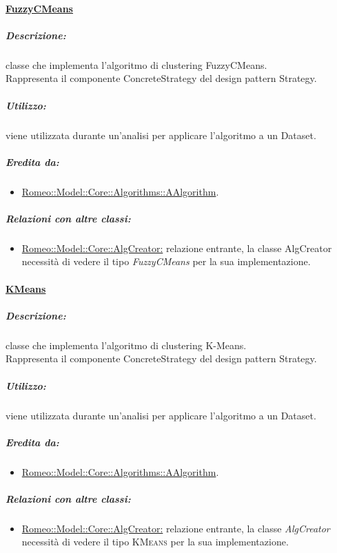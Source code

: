 		\paragraph{\underline{FuzzyCMeans}}
			\label{algorithms:fuzzycmeans}
			
				\subparagraph{Descrizione:} classe che implementa l’algoritmo di clustering\g{} FuzzyCMeans.
				\\Rappresenta il componente ConcreteStrategy del design pattern\g{} Strategy.
				
				\subparagraph{Utilizzo:} viene utilizzata durante un’analisi per applicare l’algoritmo a un Dataset\g{}.
				
				\subparagraph{Eredita da:}
					\begin{itemize}
						\item \hyperref[algorithms::algorithms]{Romeo::Model::Core::Algorithms::AAlgorithm}.
					\end{itemize}
					
				\subparagraph{Relazioni con altre classi:}
					\begin{itemize}
						\item \hyperref[]{Romeo::Model::Core::AlgCreator:} relazione entrante, la classe AlgCreator necessità di vedere il tipo \textsl{FuzzyCMeans} per la sua implementazione.
					\end{itemize}
		
		\paragraph{\underline{KMeans}}
		\label{algorithms::kmeans}
		
			\subparagraph{Descrizione:} classe che implementa l’algoritmo di clustering\g{} K-Means.
			\\Rappresenta il componente ConcreteStrategy del design pattern\g{} Strategy.
			
			\subparagraph{Utilizzo:} viene utilizzata durante un’analisi per applicare l’algoritmo a un Dataset\g{}.
			
			\subparagraph{Eredita da:}
				\begin{itemize}
					\item \hyperref[algorithms::algorithms]{Romeo::Model::Core::Algorithms::AAlgorithm}.
				\end{itemize}
				
			\subparagraph{Relazioni con altre classi:}
				\begin{itemize}
					\item \hyperref[]{Romeo::Model::Core::AlgCreator:} relazione entrante, la classe \textsl{AlgCreator} necessità di vedere il tipo \textsc{KMeans} per la sua implementazione.
				\end{itemize}
			
